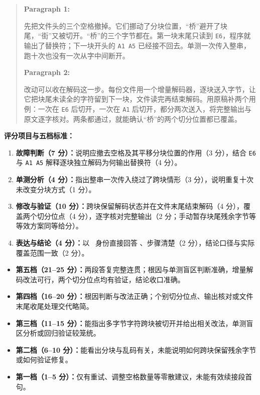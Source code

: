 \documentclass[UTF8, zihao=5, a4paper, fontset=fandol]{ctexart}
\begin{document}
\begin{quote}
\vspace{-2pt}
\noindent\textbf{Paragraph 1:}\par
\kaishu\noindent\hspace*{2em}先把文件头的三个空格撤掉。它们挪动了分块位置，“桥”避开了块尾，“街”又被切开。“桥”的三个字节都在。第一块末尾只读到 \texttt{E6}，程序就输出了替换符；下一块开头的 \texttt{A1 A5} 已经接不回去。单测一次传入整串，跑十次也没有一次从字中间断开。\par
\smallskip
\noindent\textbf{Paragraph 2:}\par
\kaishu\noindent\hspace*{2em}改动可以收在解码这一步。每份文件用一个增量解码器，逐块送入字节，让它把块尾未读全的字符留到下一块，文件读完再结束解码。用原稿补两个用例：一次在 \texttt{E6} 后切开，一次在 \texttt{A1} 后切开，都分两次送入，将完整输出与原文逐字核对。两条都通过，就能确认“桥”的两个切分位置都已覆盖。
\vspace{-2pt}
\end{quote}

\noindent\textbf{评分项目与五档标准：}
\begin{enumerate}[label=（\arabic*）, leftmargin=2.8em, labelsep=0pt, itemsep=0.5pt, topsep=1.5pt]
  \item \textbf{故障判断（7 分）：}说明应撤去空格及其平移分块位置的作用（3 分），结合 \texttt{E6} 与 \texttt{A1 A5} 解释逐块独立解码为何输出替换符（4 分）。
  \item \textbf{单测分析（4 分）：}指出整串一次传入绕过了跨块情形（3 分），说明重复十次未改变分块方式（1 分）。
  \item \textbf{修改与验证（10 分）：}跨块保留解码状态并在文件末尾结束解码（4 分），覆盖两个切分位点（4 分），逐字核对完整输出（2 分；手动暂存块尾残余字节等等效方案同等给分）。
  \item \textbf{表达与结论（4 分）：}以 \atag~身份直接回答 \utag、步骤清楚（2 分），结论口径与实际覆盖范围一致（2 分）。
\end{enumerate}

\begin{itemize}[leftmargin=1.8em, itemsep=0.5pt, topsep=1.5pt]
  \item \textbf{第五档（21--25 分）：}两段答复完整连贯；根因与单测盲区判断准确，增量解码改法可行，两个切分位点均有验证，结论收口准确。
  \item \textbf{第四档（16--20 分）：}根因判断与改法正确；个别切分位点、输出核对或文件末尾收尾处理交代略简。
  \item \textbf{第三档（11--15 分）：}能指出多字节字符跨块被切开并给出相关改法，单测盲区分析或回归验证较笼统。
  \item \textbf{第二档（6--10 分）：}能看出分块与乱码有关，未能说明如何跨块保留残余字节或如何验证修复。
  \item \textbf{第一档（1--5 分）：}仅有重试、调整空格数量等零散建议，未能有效续接段首句。
\end{itemize}
\end{document}
